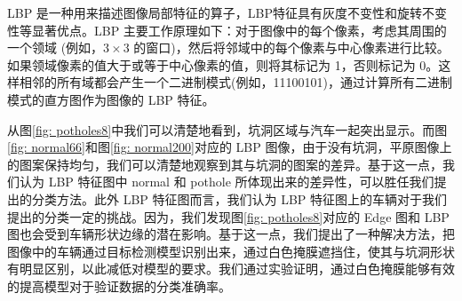 \documentclass[a4paper, 10pt]{article}
\begin{document}
	
	LBP 是一种用来描述图像局部特征的算子，LBP特征具有灰度不变性和旋转不变性等显著优点。LBP 主要工作原理如下：对于图像中的每个像素，考虑其周围的一个领域 (例如，$3 \times 3$ 的窗口)，然后将邻域中的每个像素与中心像素进行比较。如果领域像素的值大于或等于中心像素的值，则将其标记为 1，否则标记为 0。这样相邻的所有域都会产生一个二进制模式(例如，11100101)，通过计算所有二进制模式的直方图作为图像的 LBP 特征。
	
	从图\ref{fig: potholes8}中我们可以清楚地看到，坑洞区域与汽车一起突出显示。而图\ref{fig: normal66}和图\ref{fig: normal200}对应的 LBP 图像，由于没有坑洞，平原图像上的图案保持均匀，我们可以清楚地观察到其与坑洞的图案的差异。基于这一点，我们认为 LBP 特征图中 normal 和 pothole 所体现出来的差异性，可以胜任我们提出的分类方法。此外 LBP 特征图而言，我们认为 LBP 特征图上的车辆对于我们提出的分类一定的挑战。因为，我们发现图\ref{fig: potholes8}对应的 Edge 图和 LBP 图也会受到车辆形状边缘的潜在影响。基于这一点，我们提出了一种解决方法，把图像中的车辆通过目标检测模型识别出来，通过白色掩膜遮挡住，使其与坑洞形状有明显区别，以此减低对模型的要求。我们通过实验证明，通过白色掩膜能够有效的提高模型对于验证数据的分类准确率。
	
\end{document}
